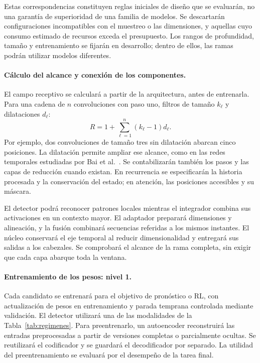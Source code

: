 \documentclass[11pt,letterpaper]{article}
\begin{document}
Estas correspondencias constituyen reglas iniciales de diseño que se evaluarán, no una garantía de superioridad de una familia de modelos. Se descartarán configuraciones incompatibles con el muestreo o las dimensiones, y aquellas cuyo consumo estimado de recursos exceda el presupuesto. Los rangos de profundidad, tamaño y entrenamiento se fijarán en desarrollo; dentro de ellos, las ramas podrán utilizar modelos diferentes.

\paragraph{Cálculo del alcance y conexión de los componentes.}
El campo receptivo se calculará a partir de la arquitectura, antes de entrenarla. Para una cadena de $n$ convoluciones con paso uno, filtros de tamaño $k_\ell$ y dilataciones $d_\ell$:
\[
R=1+\sum_{\ell=1}^{n}(k_\ell-1)d_\ell.
\]
Por ejemplo, dos convoluciones de tamaño tres sin dilatación abarcan cinco posiciones. La dilatación permite ampliar ese alcance, como en las redes temporales estudiadas por Bai et al.~\cite{bai2018tcn}. Se contabilizarán también los pasos y las capas de reducción cuando existan. En recurrencia se especificarán la historia procesada y la conservación del estado; en atención, las posiciones accesibles y su máscara.

El detector podrá reconocer patrones locales mientras el integrador combina sus activaciones en un contexto mayor. El adaptador preparará dimensiones y alineación, y la fusión combinará secuencias referidas a los mismos instantes. El núcleo conservará el eje temporal al reducir dimensionalidad y entregará sus salidas a los cabezales. Se comprobará el alcance de la rama completa, sin exigir que cada capa abarque toda la ventana.

\paragraph{Entrenamiento de los pesos: nivel 1.}
Cada candidato se entrenará para el objetivo de pronóstico o RL, con actualización de pesos en entrenamiento y parada temprana controlada mediante validación. El detector utilizará una de las modalidades de la Tabla~\ref{tab:regimenes}. Para preentrenarlo, un autoencoder reconstruirá las entradas preprocesadas a partir de versiones completas o parcialmente ocultas. Se reutilizará el codificador y se guardará el decodificador por separado. La utilidad del preentrenamiento se evaluará por el desempeño de la tarea final.
\end{document}
